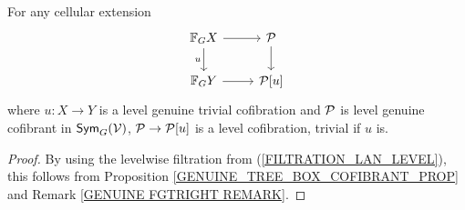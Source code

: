 \documentclass[a4paper,10pt]{article}%
\begin{document}




\begin{corollary}\label{CELLULAR_LEVEL_COFIB_PROP} 
  For any cellular extension  
  \[ 
  \begin{tikzcd} 
    \mathbb F_G X \arrow[d, "u"'] \arrow[r] & \P \arrow[d]\\ 
    \mathbb F_G Y \arrow[r] & \P[u] 
  \end{tikzcd} 
  \] 
  where $u: X \to Y$ is a level genuine trivial cofibration and $\P$ is level genuine cofibrant in $\Sym_G(\V)$, $\P \to \P[u]$ is a level cofibration, trivial if $u$ is. 
\end{corollary}  
\begin{proof} 
  By using the levelwise filtration from (\ref{FILTRATION_LAN_LEVEL}), this follows from Proposition \ref{GENUINE_TREE_BOX_COFIBRANT_PROP} and Remark \ref{GENUINE FGTRIGHT REMARK}. 
\end{proof} 
\end{document}
